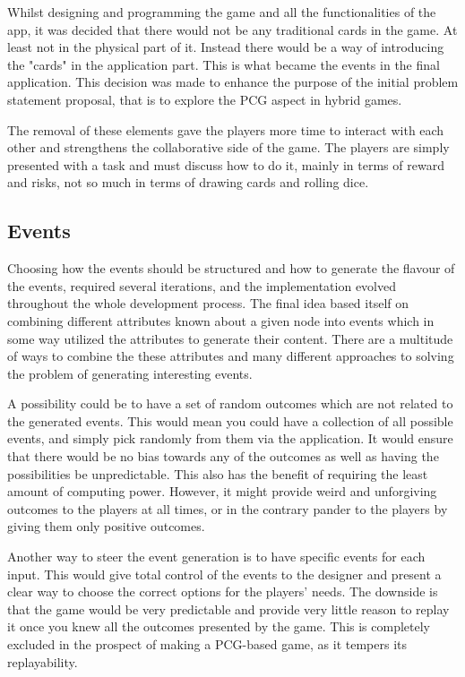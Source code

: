 Whilst designing and programming the game and all the functionalities of the app, it was decided that there would not be any traditional cards in the game. At least not in the physical part of it. Instead there would be a way of introducing the "cards" in the application part.
This is what became the events in the final application. This decision was made to enhance the purpose of the initial problem statement proposal, that is to explore the PCG aspect in hybrid games.

The removal of these elements gave the players more time to interact with each other and strengthens the collaborative side of the game. The players are simply presented with a task and must discuss how to do it, mainly in terms of reward and risks, not so much in terms of drawing cards and rolling dice.

\subsection{Events}
Choosing how the events should be structured and how to generate the flavour of the events, required several iterations, and the implementation evolved throughout the whole development process. The final idea based itself on combining different attributes known about a given node into events which in some way utilized the attributes to generate their content. There are a multitude of ways to combine the these attributes and many different approaches to solving the problem of generating interesting events.

A possibility could be to have a set of random outcomes which are not related to the generated events. This would mean you could have a collection of all possible events, and simply pick randomly from them via the application. It would ensure that there would be no bias towards any of the outcomes as well as having the possibilities be unpredictable. This also has the benefit of requiring the least amount of computing power. However, it might provide weird and unforgiving outcomes to the players at all times, or in the contrary pander to the players by giving them only positive outcomes.

Another way to steer the event generation is to have specific events for each input. This would give total control of the events to the designer and present a clear way to choose the correct options for the players' needs. The downside is that the game would be very predictable and provide very little reason to replay it once you knew all the outcomes presented by the game. This is completely excluded in the prospect of making a PCG-based game, as it tempers its replayability.

